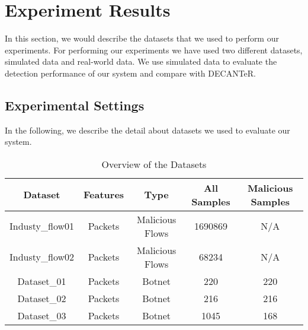 \section{Experiment Results}

In this section, we would describe the datasets that we used to perform our experiments. For performing our experiments we have used two different datasets, simulated data and real-world data. We use simulated data to evaluate the detection performance of our system and compare with DECANTeR. \\


\subsection{Experimental Settings}

In the following, we describe the detail about datasets we used to evaluate our system.\\

\begin{table}[!h]
\centering
\caption{Overview of the Datasets}
\label{tbl:db_01}
\begin{tabular}{|c|c|c|c|c|}
\hline
Dataset         & Features & Type            & All Samples & Malicious Samples \\ \hline
Industy\_flow01 & Packets  & Malicious Flows & 1690869     & N/A               \\ \hline
Industy\_flow02 & Packets  & Malicious Flows & 68234       & N/A               \\ \hline
Dataset\_01     & Packets  & Botnet          & 220         & 220               \\ \hline
Dataset\_02     & Packets  & Botnet          & 216         & 216               \\ \hline
Dataset\_03     & Packets  & Botnet          & 1045         & 168               \\ \hline
\end{tabular}
\end{table}

